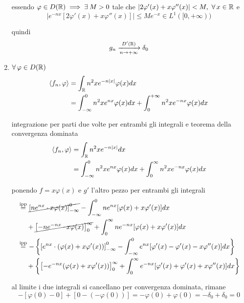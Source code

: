 \begin{enumerate}
essendo $\varphi \in D(\RR) \implies \exists M > 0$ tale che $| 2\varphi '(x) + x\varphi ''(x)| < M,\ \forall x\in \RR $ e
\begin{equation*}
\left| e^{ - nx}[ 2\varphi '(x) + x\varphi ''(x)]\right| \leq Me^{ - x} \in L^{1}([ 0, + \infty))
\end{equation*}

quindi
\begin{equation*}
g_{n}\xrightarrow[n\rightarrow + \infty ]{D'(\mathbb{R})} \delta _{0}
\end{equation*}
\item $\forall \varphi \in D(\RR)$
\begin{equation*}
\begin{aligned}
\langle f_{n} ,\varphi \rangle  & = \int _{\mathbb{R} } n^{2} xe^{ - n| x| } \varphi (x) dx\\
 & = \int ^{0}_{ - \infty } n^{2} xe^{nx} \varphi (x) dx + \int ^{ + \infty }_{0} n^{2} xe^{ - nx} \varphi (x) dx
\end{aligned}
\end{equation*}

integrazione per parti due volte per entrambi gli integrali e teorema della convergenza dominata
\begin{align*}
\langle f_{n} ,\varphi \rangle  & = \int _{\mathbb{R} } n^{2} xe^{ - n| x| } dx\\
 & = \int ^{0}_{ - \infty } n^{2} xe^{nx} \varphi (x) dx + \int ^{\infty }_{0} n^{2} xe^{ - nx} \varphi (x) dx
\end{align*}

ponendo $f = x\varphi (x)$ e $g'$ l'altro pezzo per entrambi gli integrali
\begin{align*}
 & \overset{\text{ipp}}{ = }\cancel{\left[ ne^{nx} \cdot x\varphi (x)\right]^{0}_{ - \infty }} - \int ^{0}_{ - \infty } ne^{nx}[ \varphi (x) + x\varphi '(x)] dx\\
 & \ \ \ \ + \cancel{\left[ - ne^{ - nx} \cdot x\varphi (x)\right]^{\infty }_{0}} + \int ^{\infty }_{0} ne^{ - nx}[ \varphi (x) + x\varphi '(x)] dx\\
 & \overset{\text{ipp}}{ = } - \left\{\left[ e^{nx} \cdot (\varphi (x) + x\varphi '(x))\right]^{0}_{ - \infty } - \int ^{0}_{ - \infty } e^{nx}[ \varphi '(x) - \varphi '(x) - x\varphi ''(x)] dx\right\}\\
 & \ \ \ \ + \left\{\left[ - e^{ - nx}(\varphi (x) + x\varphi '(x))\right]^{\infty }_{0} + \int ^{\infty }_{0} e^{ - nx}[ \varphi '(x) + \varphi '(x) + x\varphi ''(x)] dx\right\}
\end{align*}

al limite i due integrali si cancellano per convergenza dominata, rimane
\begin{equation*}
- [ \varphi (0) - 0] + [ 0 - (- \varphi (0))] = - \varphi (0) + \varphi (0) = - \delta _{0} + \delta _{0} = 0
\end{equation*}
\end{enumerate}
